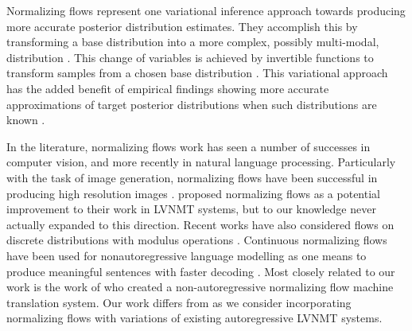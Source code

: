 Normalizing flows represent one variational inference approach towards producing more accurate posterior distribution estimates. They accomplish this by transforming a base distribution into a more complex, possibly multi-modal, distribution \cite{tabak2010densityestimationdual,tabak2013familyofnonparametricdensity}. This change of variables is achieved by invertible functions to transform samples from a chosen base distribution \cite{rezende2015VIwithNF}. This variational approach has the added benefit of empirical findings showing more accurate approximations of target posterior distributions when such distributions are known \cite{rezende2015VIwithNF}.

In the literature, normalizing flows work has seen a number of successes in computer vision, and more recently in natural language processing. Particularly with the task of image generation, normalizing flows have been successful in producing high resolution images \cite{ kingma2016IAF, tomczak2016Householder,kingma2018GLOW, Berg2018SylvesterNF}. \citet{schulz2018StochasticDecoder} proposed normalizing flows as a potential improvement to their work in \ac{LVNMT} systems, but to our knowledge never actually expanded to this direction. Recent works have also considered flows on discrete distributions with modulus operations \cite{hoogeboom2019IntegerDiscreteFlows, tran2019discreteflows}. Continuous normalizing flows have been used for nonautoregressive language modelling as one means to produce meaningful sentences with faster decoding \cite{ziegler2019LatentNFforDiscrete}. Most closely related to our work is the work of \citet{flowseq2019Xuezhe} who created a  non-autoregressive normalizing flow machine translation system.  Our work differs from \citet{flowseq2019Xuezhe} as we consider incorporating normalizing flows with variations of existing autoregressive \ac{LVNMT} systems. 


